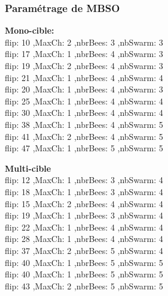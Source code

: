 \subsubsection{Paramétrage de MBSO}
\noindent
\begin{minipage}[t]{0.55\textwidth}
	\textbf{Mono-cible:} \\
	flip: 10 ,MaxCh: 2 ,nbrBees: 3 ,nbSwarm: 3\\
	flip: 17 ,MaxCh: 1 ,nbrBees: 4 ,nbSwarm: 3\\
	flip: 19 ,MaxCh: 2 ,nbrBees: 4 ,nbSwarm: 3\\
	flip: 21 ,MaxCh: 1 ,nbrBees: 4 ,nbSwarm: 4\\
	flip: 20 ,MaxCh: 1 ,nbrBees: 4 ,nbSwarm: 3\\
	flip: 25 ,MaxCh: 1 ,nbrBees: 4 ,nbSwarm: 4\\
	flip: 30 ,MaxCh: 1 ,nbrBees: 4 ,nbSwarm: 4\\
	flip: 38 ,MaxCh: 1 ,nbrBees: 4 ,nbSwarm: 5\\
	flip: 41 ,MaxCh: 2 ,nbrBees: 4 ,nbSwarm: 5\\
	flip: 47 ,MaxCh: 1 ,nbrBees: 5 ,nbSwarm: 5\\
	
\end{minipage}\hfill
\hspace{0.2cm}
\begin{minipage}[t]{0.55\textwidth}
	\textbf{Multi-cible}\\
	flip: 12 ,MaxCh: 1 ,nbrBees: 3 ,nbSwarm: 4\\
	flip: 18 ,MaxCh: 1 ,nbrBees: 3 ,nbSwarm: 4\\
	flip: 15 ,MaxCh: 2 ,nbrBees: 4 ,nbSwarm: 4\\
	flip: 19 ,MaxCh: 1 ,nbrBees: 3 ,nbSwarm: 4\\
	flip: 22 ,MaxCh: 1 ,nbrBees: 4 ,nbSwarm: 4\\
	flip: 28 ,MaxCh: 1 ,nbrBees: 4 ,nbSwarm: 4\\
	flip: 37 ,MaxCh: 2 ,nbrBees: 5 ,nbSwarm: 4\\
	flip: 40 ,MaxCh: 1 ,nbrBees: 5 ,nbSwarm: 5\\
	flip: 40 ,MaxCh: 1 ,nbrBees: 5 ,nbSwarm: 5\\
	flip: 43 ,MaxCh: 2 ,nbrBees: 5 ,nbSwarm: 5\\
	
	
\end{minipage}\hfill


